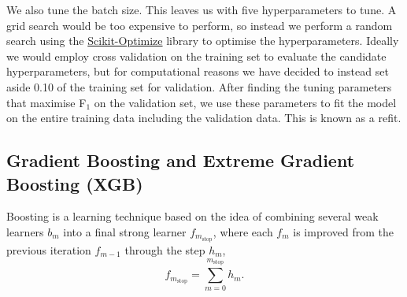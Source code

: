 \documentclass[a4paper, 11pt, twocolumn]{article}
\begin{document}
We also tune the batch size. This leaves us with five hyperparameters to tune. A 
grid search would be too expensive to perform, so instead we perform a random
search using the \href{https://scikit-optimize.github.io/}{Scikit-Optimize} 
library to optimise the hyperparameters.
Ideally we would employ cross validation on the training set to evaluate the 
candidate hyperparameters, but for computational reasons we have decided to 
instead set aside 0.10 of the training set for validation. After finding the 
tuning parameters that maximise F$_1$ on the validation set, we use these 
parameters to fit the model on the entire training data including the validation 
data. This is known as a refit. 


\subsection{Gradient Boosting and Extreme Gradient Boosting (XGB)}
Boosting is a learning technique based on the idea of combining several weak
learners $b_m$ into a final strong learner $f_{m_\text{stop}}$, where each
$f_m$ is improved from the previous iteration $f_{m-1}$ through the step $h_m$, 
\begin{equation}
      f_{m_\text{stop}} = \sum_{m=0}^{m_\text{stop}} h_m.
\end{equation}
\end{document}
